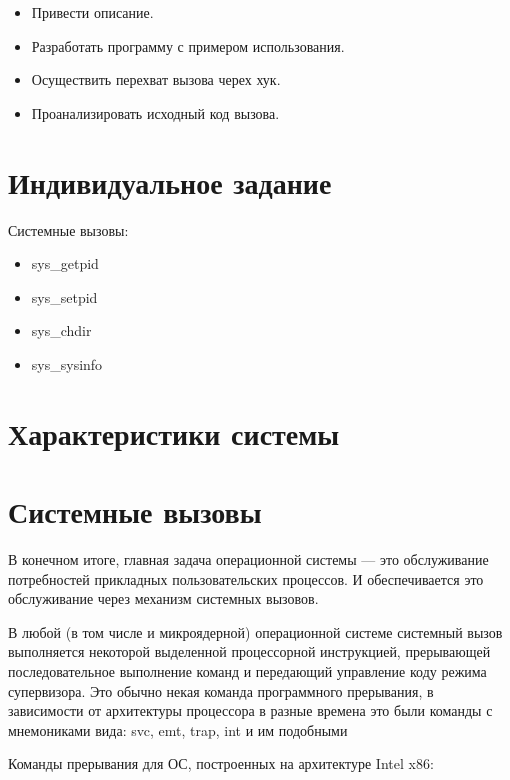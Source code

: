 \documentclass[14pt,a4paper,report]{report}
\begin{document}
\begin{itemize}
	\item Привести описание.
	\item Разработать программу с примером использования.
	\item Осуществить перехват вызова черех хук.
	\item Проанализировать исходный код вызова.
\end{itemize}

\section{Индивидуальное задание}

Системные вызовы:

\begin{itemize}
	\item sys\_getpid
	\item sys\_setpid
	\item sys\_chdir
	\item sys\_sysinfo
\end{itemize}

\section{Характеристики системы}



\section{Системные вызовы}


В конечном итоге, главная задача операционной системы — это обслуживание потребностей прикладных пользовательских процессов. И обеспечивается это обслуживание через механизм системных вызовов.

В любой (в том числе и микроядерной) операционной системе системный вызов выполняется некоторой выделенной процессорной инструкцией, прерывающей последовательное выполнение команд и передающий управление коду режима супервизора. Это обычно некая команда программного прерывания, в зависимости от архитектуры процессора в разные времена это были команды с мнемониками вида: svc, emt, trap, int и им подобными \cite{cite-syscalls}

\clearpage

Команды прерывания для ОС, построенных на архитектуре Intel x86:
\end{document}
